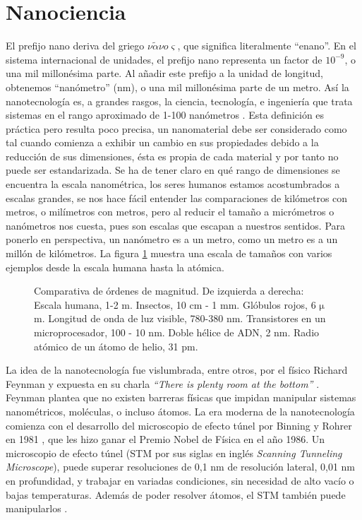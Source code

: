 \section{Nanociencia}
El prefijo nano deriva del griego $\nu \tilde{\alpha} \nu o \varsigma$, que significa literalmente ``enano''. En el sistema internacional de unidades, el prefijo nano representa un factor de $\mathrm{10^{-9}}$, o una mil millonésima parte. Al añadir este prefijo a la unidad de longitud, obtenemos ``nanómetro'' (nm), o una mil millonésima parte de un metro. Así la nanotecnología es, a grandes rasgos, la ciencia, tecnología, e ingeniería que trata sistemas en el rango aproximado de 1-100 nanómetros \citep{Haick2013,Gressler2013}. Esta definición es práctica pero resulta poco precisa, un nanomaterial debe ser considerado como tal cuando comienza a exhibir un cambio en sus propiedades debido a la reducción de sus dimensiones, ésta es propia de cada material y por tanto no puede ser estandarizada. Se ha de tener claro en qué rango de dimensiones se encuentra la escala nanométrica, los seres humanos estamos acostumbrados a escalas grandes, se nos hace fácil entender las comparaciones de kilómetros con metros, o milímetros con metros, pero al reducir el tamaño a micrómetros o nanómetros nos cuesta, pues son escalas que escapan a nuestros sentidos. Para ponerlo en perspectiva, un nanómetro es a un metro, como un metro es a un millón de kilómetros. La figura \ref{fig:scale} muestra una escala de tamaños con varios ejemplos desde la escala humana hasta la atómica.

\begin{figure}[h!]
	\centering
	\caption[Comparativa de ódenes de magnitud desde metros hasta picometros]{Comparativa de órdenes de magnitud. De izquierda a derecha: Escala humana, 1-2 m. Insectos, 10 cm - 1 mm. Glóbulos rojos, 6 $\mathrm{\mu}$m. Longitud de onda de luz visible, 780-380 nm. Transistores en un microprocesador, 100 - 10 nm. Doble hélice de ADN, 2 nm. Radio atómico de un átomo de helio, 31 pm.}
\label{fig:scale}
\end{figure}

La idea de la nanotecnología fue vislumbrada, entre otros, por el físico Richard Feynman y expuesta en su charla \emph{``There is plenty room at the bottom''} \citep{Feynman1960}. Feynman plantea que no existen barreras físicas que impidan manipular sistemas nanométricos, moléculas, o incluso átomos. La era moderna de la nanotecnología comienza con el desarrollo del microscopio de efecto túnel por Binning y Rohrer en 1981 \citep{Binnig1982}, que les hizo ganar el Premio Nobel de Física en el año 1986. Un microscopio de efecto túnel (STM por sus siglas en inglés \emph{Scanning Tunneling Microscope}), puede superar resoluciones de 0,1 nm de resolución lateral, 0,01 nm en profundidad, y trabajar en variadas condiciones, sin necesidad de alto vacío o bajas temperaturas. Además de poder resolver átomos, el STM también puede manipularlos \citep{Chen2008}.

